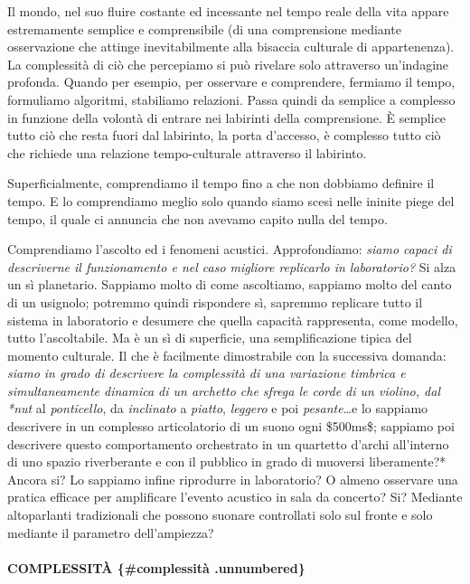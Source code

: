 \documentclass[a4paper,11pt]{article}
\begin{document}
Il mondo, nel suo fluire costante ed incessante nel tempo reale della
vita appare estremamente semplice e comprensibile (di una comprensione
mediante osservazione che attinge inevitabilmente alla bisaccia
culturale di appartenenza). La complessità di ciò che percepiamo si può
rivelare solo attraverso un'indagine profonda. Quando per esempio, per
osservare e comprendere, fermiamo il tempo, formuliamo algoritmi,
stabiliamo relazioni. Passa quindi da semplice a complesso in funzione
della volontà di entrare nei labirinti della comprensione. È semplice
tutto ciò che resta fuori dal labirinto, la porta d'accesso, è complesso
tutto ciò che richiede una relazione tempo-culturale attraverso il
labirinto.

Superficialmente, comprendiamo il tempo fino a che non dobbiamo definire
il tempo. E lo comprendiamo meglio solo quando siamo scesi nelle ininite
piege del tempo, il quale ci annuncia che non avevamo capito nulla del
tempo.

Comprendiamo l'ascolto ed i fenomeni acustici. Approfondiamo: \emph{siamo
capaci di descriverne il funzionamento e nel caso migliore replicarlo in
laboratorio?} Si alza un sì planetario. Sappiamo molto di come
ascoltiamo, sappiamo molto del canto di un usignolo; potremmo quindi
rispondere sì, sapremmo replicare tutto il sistema in laboratorio e
desumere che quella capacità rappresenta, come modello, tutto
l'ascoltabile. Ma è un sì di superficie, una semplificazione tipica del
momento culturale. Il che è facilmente dimostrabile con la successiva
domanda: \emph{siamo in grado di descrivere la complessità di una variazione
timbrica e simultaneamente dinamica di un archetto che sfrega le corde
di un violino, dal *nut} al \emph{ponticello}, da \emph{inclinato} a \emph{piatto},
\emph{leggero} e poi \emph{pesante}\ldots{}e lo sappiamo descrivere in un complesso
articolatorio di un suono ogni \$500ms\$; sappiamo poi descrivere questo
comportamento orchestrato in un quartetto d'archi all'interno di uno
spazio riverberante e con il pubblico in grado di muoversi liberamente?*
Ancora si? Lo sappiamo infine riprodurre in laboratorio? O almeno
osservare una pratica efficace per amplificare l'evento acustico in sala
da concerto? Si? Mediante altoparlanti tradizionali che possono suonare
controllati solo sul fronte e solo mediante il parametro dell'ampiezza?

\paragraph{COMPLESSITÀ \{\#complessità .unnumbered\}}\hypertarget{complessit-complessit-unnumbered}{}\label{complessit-complessit-unnumbered}
\end{document}

